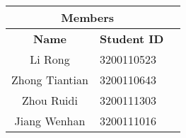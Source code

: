 \begin{table}[htp]
    \centering
    \begin{tabular}{@{}clc@{}}
        \toprule
        \multicolumn{2}{c}{\textbf{Members}}                                                               \\ \midrule\midrule
        \multicolumn{1}{c|}{\textbf{Name}}  & \textbf{Student ID} \\ \midrule
        \multicolumn{1}{c|}{Li Rong}        & 3200110523          \\
        \multicolumn{1}{c|}{Zhong Tiantian} & 3200110643          \\
        \multicolumn{1}{c|}{Zhou Ruidi}     & 3200111303          \\
        \multicolumn{1}{c|}{Jiang Wenhan}   & 3200111016          \\ \bottomrule
    \end{tabular}
\end{table}